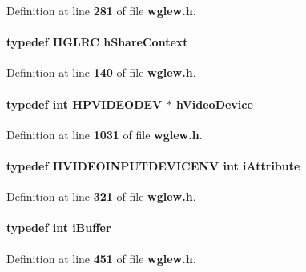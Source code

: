 Definition at line {\bf 281} of file {\bf wglew.\+h}.

\paragraph[{h\+Share\+Context}]{\setlength{\rightskip}{0pt plus 5cm}typedef {\bf H\+G\+L\+RC} {\bf h\+Share\+Context}}\label{wglew_8h_a7304940b68a48769443c1eb41a9a4a02}


Definition at line {\bf 140} of file {\bf wglew.\+h}.

\paragraph[{h\+Video\+Device}]{\setlength{\rightskip}{0pt plus 5cm}typedef {\bf int} H\+P\+V\+I\+D\+E\+O\+D\+EV $\ast$ {\bf h\+Video\+Device}}\label{wglew_8h_a7c99b7249a7c33b96e3c006bd9e0add4}


Definition at line {\bf 1031} of file {\bf wglew.\+h}.

\paragraph[{i\+Attribute}]{\setlength{\rightskip}{0pt plus 5cm}typedef H\+V\+I\+D\+E\+O\+I\+N\+P\+U\+T\+D\+E\+V\+I\+C\+E\+NV {\bf int} {\bf i\+Attribute}}\label{wglew_8h_a266939dd3ac6edf05c305ffd1a761ace}


Definition at line {\bf 321} of file {\bf wglew.\+h}.

\paragraph[{i\+Buffer}]{\setlength{\rightskip}{0pt plus 5cm}typedef {\bf int} {\bf i\+Buffer}}\label{wglew_8h_a5bbdea9850db7c8ebb25aeaa1f40012a}


Definition at line {\bf 451} of file {\bf wglew.\+h}.

